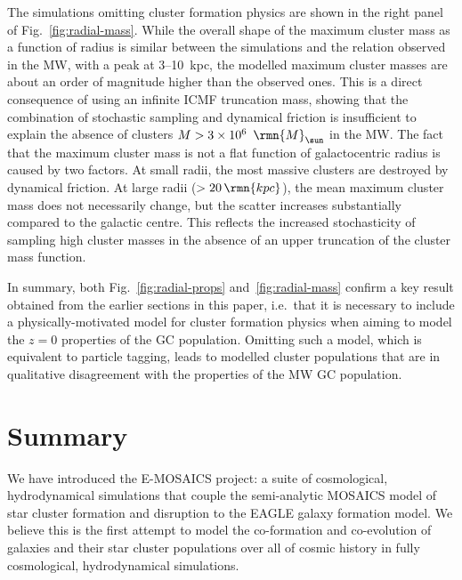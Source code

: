 \documentclass[fleqn,usenatbib]{mnras}
\newcommand\Msun{\,\rmn{M}_{\sun}}
\newcommand\kpc{\,\rmn{kpc}}
\begin{document}
The simulations omitting cluster formation physics are shown in the right panel of Fig.~\ref{fig:radial-mass}. While the overall shape of the maximum cluster mass as a function of radius is similar between the simulations and the relation observed in the MW, with a peak at 3--10~kpc, the modelled maximum cluster masses are about an order of magnitude higher than the observed ones. This is a direct consequence of using an infinite ICMF truncation mass, showing that the combination of stochastic sampling and dynamical friction is insufficient to explain the absence of clusters $M>3\times10^6~\Msun$ in the MW. The fact that the maximum cluster mass is not a flat function of galactocentric radius is caused by two factors. At small radii, the most massive clusters are destroyed by dynamical friction. At large radii ($>20\kpc$), the mean maximum cluster mass does not necessarily change, but the scatter increases substantially compared to the galactic centre. This reflects the increased stochasticity of sampling high cluster masses in the absence of an upper truncation of the cluster mass function.

In summary, both Fig.~\ref{fig:radial-props} and~\ref{fig:radial-mass} confirm a key result obtained from the earlier sections in this paper, i.e.~that it is necessary to include a physically-motivated model for cluster formation physics when aiming to model the $z=0$ properties of the GC population. Omitting such a model, which is equivalent to particle tagging, leads to modelled cluster populations that are in qualitative disagreement with the properties of the MW GC population.



\section{Summary} \label{sec:summary}

We have introduced the E-MOSAICS project: a suite of cosmological, hydrodynamical simulations that couple the semi-analytic MOSAICS model of star cluster formation and disruption to the EAGLE galaxy formation model. We believe this is the first attempt to model the co-formation and co-evolution of galaxies and their star cluster populations over all of cosmic history in fully cosmological, hydrodynamical simulations.
\end{document}
